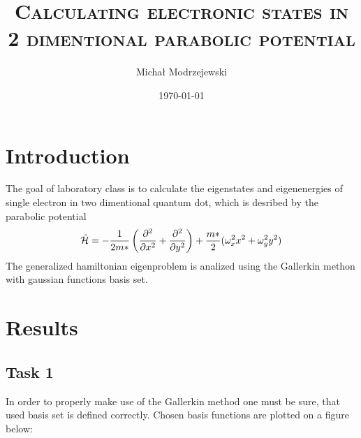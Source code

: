 \documentclass[12pt,a4]{article}
\title{\textsc{Calculating electronic states in 2 dimentional parabolic potential}}
\author{Michał Modrzejewski}
\date{\today}
\begin{document}
\maketitle

\section*{Introduction}

The goal of laboratory class is to calculate the eigenstates and eigenenergies of single electron in two dimentional quantum dot, which is desribed by the parabolic potential
\[\hat{\mathcal{H}} = -\frac{1}{2m*}\left(\pdv[2]{x} + \pdv[2]{y}\right) + \frac{m*}{2} (\omega_x^2 x^2 + \omega_y^2y^2)\]
The generalized hamiltonian eigenproblem is analized using the Gallerkin methon with gaussian functions basis set.

\section*{Results}
\subsection*{Task 1}

In order to properly make use of the Gallerkin method one must be sure, that used basis set is defined correctly. Chosen basis functions are plotted on a figure below:
\end{document}
